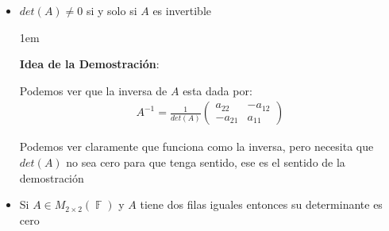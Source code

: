 \documentclass[12pt, fleqn]{report}                             %
\newenvironment{SmallIndentation}[1][0.75em]                    %
        {\begin{adjustwidth}{#1}{}\begin{footnotesize}}             %
        {\end{footnotesize}\end{adjustwidth}}                       %
\theoremstyle{break}                                            %
\DeclareMathOperator \GenericField {\mathbb{F}}                 %
\newcommand{\pVector}[1]                                        %
        { \ensuremath{\begin{pmatrix}#1\end{pmatrix}} }             %
\begin{document}
\begin{itemize}
                    Y 
                    \begin{align*}
                        det \pVector{\vec w \\ \vec u + k\vec v}
                            =  det \pVector{\vec w  \\ \vec u}
                            + det k\pVector{\vec w  \\ \vec v}
                    \end{align*}


                    \begin{SmallIndentation}[1em]
                        \textbf{Demostración}:
                        
                        Es pura talacha men :v
                        
                    
                    \end{SmallIndentation}

                \item
                    $det(A) \neq 0$ si y solo si $A$ es invertible

                    \begin{SmallIndentation}[1em]
                        \textbf{Idea de la Demostración}:
                        
                        Podemos ver que la inversa de $A$ esta dada
                        por:
                        \begin{align*}
                            A^{-1}
                                = \frac{1}{det(A)} \pVector{
                                                         a_{22} & -a_{12} \\
                                                        -a_{21} &  a_{11}
                                                    }
                        \end{align*}

                        Podemos ver claramente que funciona como la inversa, pero
                        necesita que $det(A)$ no sea cero para que tenga sentido, ese
                        es el sentido de la demostración
                    
                    \end{SmallIndentation}


                \item
                    Si $A \in M_{2 \times 2}(\GenericField)$ y $A$ tiene dos filas iguales
                    entonces su determinante es cero


\end{itemize}
\end{document}

